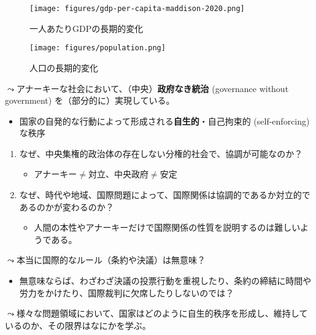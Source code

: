 \documentclass[
  xelatex,
  ja=standard]{bxjsarticle}
\providecommand{\tightlist}{%
  \setlength{\itemsep}{0pt}\setlength{\parskip}{0pt}}\usepackage{longtable,booktabs,array}
\begin{document}
\begin{figure}[htpb]

{\centering \texttt{[image: figures/gdp-per-capita-maddison-2020.png]}

}

\caption{一人あたりGDPの長期的変化}

\end{figure}

\begin{figure}[htpb]

{\centering \texttt{[image: figures/population.png]}

}

\caption{人口の長期的変化}

\end{figure}

\(\leadsto\)アナーキーな社会において、（中央）\textbf{政府なき統治}
(governance without government) を（部分的に）実現している。

\begin{itemize}
\tightlist
\item
  国家の自発的な行動によって形成される\textbf{自生的}・自己拘束的
  (self-enforcing) な秩序
\end{itemize}

\begin{enumerate}
\def\labelenumi{\arabic{enumi}.}
\tightlist
\item
  なぜ、中央集権的政治体の存在しない分権的社会で、協調が可能なのか？

  \begin{itemize}
  \tightlist
  \item
    アナーキー\(\neq\)対立、中央政府\(\neq\)安定
  \end{itemize}
\item
  なぜ、時代や地域、国際問題によって、国際関係は協調的であるか対立的であるのかが変わるのか？

  \begin{itemize}
  \tightlist
  \item
    人間の本性やアナーキーだけで国際関係の性質を説明するのは難しいようである。
  \end{itemize}
\end{enumerate}

\(\leadsto\)本当に国際的なルール（条約や決議）は無意味？

\begin{itemize}
\tightlist
\item
  無意味ならば、わざわざ決議の投票行動を重視したり、条約の締結に時間や労力をかけたり、国際裁判に欠席したりしないのでは？
\end{itemize}

\(\leadsto\)様々な問題領域において、国家はどのように自生的秩序を形成し、維持しているのか、その限界はなにかを学ぶ。


  
\end{document}
